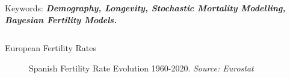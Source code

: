 \documentclass[]{beamer}
\begin{document}
\begin{frame}{\vspace{1ex}\hfill Keywords: \bfseries \textit{Demography, Longevity, Stochastic Mortality Modelling, Bayesian Fertility Models.}}
\begin{columns}[t]
\begin{block}{European Fertility Rates}
			\begin{figure}[ht]
				\begin{minipage}[b]{.5\textwidth}
				\centering
				\caption{Spanish Fertility Rate Evolution 1960-2020. \textit{Source: Eurostat}}
				\end{minipage}

\end{figure}
\end{block}
\end{columns}
\end{frame}
\end{document}
